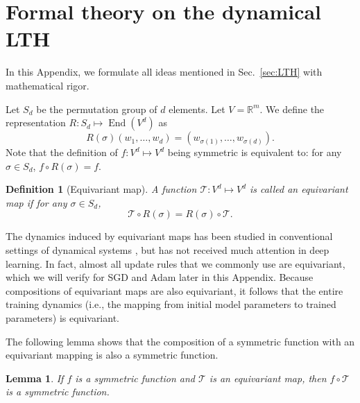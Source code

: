 \documentclass{article}
\theoremstyle{plain}
\newtheorem{lemma}{Lemma}
\newtheorem{definition}{Definition}
\begin{document}
\section{Formal theory on the dynamical LTH}\label{app:DLTH}

In this Appendix, we formulate all ideas mentioned in Sec.~\ref{sec:LTH} with mathematical rigor. 

Let $S_d$ be the permutation group of $d$ elements. Let $V = \mathbb{R}^m$. We define the representation $R:S_d\mapsto \operatorname{End}(V^d)$ as
\begin{equation}    \label{eq:Sd_rep}
    R(\sigma)(w_1, \dots, w_d) 
    = (w_{\sigma(1)}, \dots, w_{\sigma(d)})
    .
\end{equation}
Note that the definition of $f:V^d\mapsto V^d$ being symmetric is equivalent to: for any $\sigma\in S_d$, $f\circ R(\sigma) = f$. 

\begin{definition}[Equivariant map]
    A function $\mathcal{T}:V^d\mapsto V^d$ is called an equivariant map if for any $\sigma\in S_d$, 
    \begin{equation}
        \mathcal{T} \circ R(\sigma) = R(\sigma) \circ \mathcal{T}   .
    \end{equation}
\end{definition}
The dynamics induced by equivariant maps has been studied in conventional settings of dynamical systems \citep{field1980equivariant}, but has not received much attention in deep learning. In fact, almost all update rules that we commonly use are equivariant, which we will verify for SGD and Adam later in this Appendix. Because compositions of equivariant maps are also equivariant, it follows that the entire training dynamics (i.e., the mapping from initial model parameters to trained parameters) is equivariant. 

The following lemma shows that the composition of a symmetric function with an equivariant mapping is also a symmetric function. 
\begin{lemma}
    If $f$ is a symmetric function and $\mathcal{T}$ is an equivariant map, then $f\circ\mathcal{T}$ is a symmetric function. 
\end{lemma}
\end{document}
